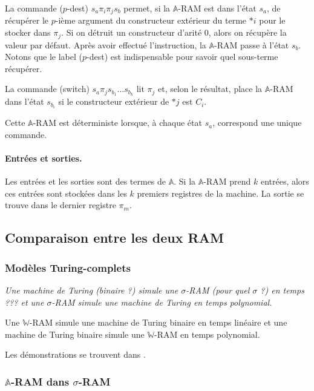 \documentclass{article}
\newcommand{\bbA}{\mathbb{A}}
\begin{document}
\begin{definition}
			La commande ($p$-dest) $s_a \pi_i \pi_j s_b$ permet, si la $\bbA$-RAM est dans l'état $s_a$, de récupérer le $p$-ième argument du constructeur extérieur du terme $*i$ pour le stocker dans $\pi_j$. Si on détruit un constructeur d'arité $0$, alors on récupère la valeur par défaut. Après avoir effectué l'instruction, la $\bbA$-RAM passe à l'état $s_b$. Notons que le label ($p$-dest) est indispensable pour savoir quel sous-terme récupérer. 
			
			La commande (switch) $s_a \pi_j s_{b_1} \dots s_{b_k}$ lit $\pi_j$ et, selon le résultat, place la $\bbA$-RAM dans l'état $s_{b_i}$ si le constructeur extérieur de $*j$ est $C_i$.
			
			Cette $\bbA$-RAM est déterministe lorsque, à chaque état $s_a$, correspond une unique commande. 
		\end{definition}
		
		
		\paragraph{Entrées et sorties.}
		Les entrées et les sorties sont des termes de $\bbA$. Si la $\bbA$-RAM prend $k$ entrées, alors ces entrées sont stockées dans les $k$ premiers registres de la machine. La sortie se trouve dans le dernier registre $\pi_m$. 
		
		
		\subsection{Comparaison entre les deux RAM}
		
		
			\subsubsection{Modèles Turing-complets}
		
		
			\begin{theorem} 
				\emph{Une machine de Turing (binaire ?) simule une $\sigma$-RAM (pour quel $\sigma$ ?) en temps ??? et une $\sigma$-RAM simule une machine de Turing en temps polynomial.}
				
				Une $\mathbb{W}$-RAM simule une machine de Turing binaire en temps linéaire et une machine de Turing binaire simule une $\mathbb{W}$-RAM en temps polynomial.
			\end{theorem}
			
			Les démonstrations se trouvent dans .

			
			\subsubsection{$\bbA$-RAM dans $\sigma$-RAM}
\end{document}
